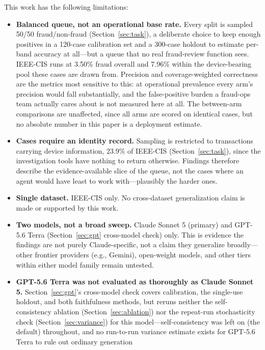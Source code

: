 \documentclass[]{ieeeaccess}
\begin{document}
This work has the following limitations:

\begin{itemize}
\item \textbf{Balanced queue, not an operational base rate.} Every
  split is sampled 50/50 fraud/non-fraud (Section~\ref{sec:task}), a
  deliberate choice to keep enough positives in a 120-case calibration
  set and a 300-case holdout to estimate per-band accuracy at all---but
  a queue that no real fraud-review function sees. IEEE-CIS runs at
  3.50\% fraud overall and 7.96\% within the device-bearing pool these
  cases are drawn from. Precision and coverage-weighted correctness
  are the metrics most sensitive to this: at operational prevalence
  every arm's precision would fall substantially, and the
  false-positive burden a fraud-ops team actually cares about is not
  measured here at all. The between-arm comparisons are unaffected,
  since all arms are scored on identical cases, but no absolute number
  in this paper is a deployment estimate.
\item \textbf{Cases require an identity record.} Sampling is restricted
  to transactions carrying device information, 23.9\% of IEEE-CIS
  (Section~\ref{sec:task}), since the investigation tools have nothing
  to return otherwise. Findings therefore describe the
  evidence-available slice of the queue, not the cases where an agent
  would have least to work with---plausibly the harder ones.
\item \textbf{Single dataset.} IEEE-CIS only. No cross-dataset
  generalization claim is made or supported by this work.
\item \textbf{Two models, not a broad sweep.} Claude Sonnet 5 (primary)
  and GPT-5.6 Terra (Section~\ref{sec:gpt} cross-model check) only. This is
  evidence the findings are not purely Claude-specific, not a claim they
  generalize broadly---other frontier providers (e.g., Gemini),
  open-weight models, and other tiers within either model family remain
  untested.
\item \textbf{GPT-5.6 Terra was not evaluated as thoroughly as Claude
  Sonnet 5.} Section~\ref{sec:gpt}'s cross-model check covers calibration, the
  single-use holdout, and both faithfulness methods, but reruns neither
  the self-consistency ablation (Section~\ref{sec:ablation}) nor the repeat-run
  stochasticity check (Section~\ref{sec:variance}) for this model---self-consistency
  was left on (the default) throughout, and no run-to-run variance
  estimate exists for GPT-5.6 Terra to rule out ordinary generation

\end{itemize}
\end{document}
